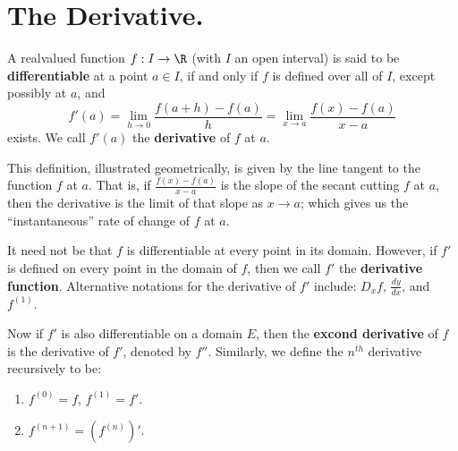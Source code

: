 
\section{The Derivative.}

\begin{definition}
    A realvalued function $f:I \rightarrow \R$ (with $I$ an open interval) is said to be 
    \textbf{differentiable} at a point  $a \in I$, if and only if $f$ is defined 
    over all of  $I$, except possibly at  $a$, and 
        \begin{equation}
            f'(a)=\lim_{h \rightarrow 0}{\frac{f(a+h)-f(a)}{h}}=\lim_{x \rightarrow a}
            {\frac{f(x)-f(a)}{x-a}}		
        \end{equation} 
        exists. We call $f'(a)$ the \textbf{derivative} of $f$ at  $a$.
\end{definition}

This definition, illustrated geometrically, is given by the line tangent to the 
function $f$ at $a$. That is, if  $\frac{f(x)-f(a)}{x-a}$ is the slope of the 
secant cutting $f$ at  $a$, then the derivative is the limit of that slope as  $x \rightarrow a$; 
which gives us the ``instantaneous'' rate of change of $f$ at  $a$.

It need not be that  $f$ is differentiable at every point in its domain. However, 
if  $f'$ is defined on every point in the domain of  $f$, then we call  $f'$ the 
\textbf{derivative function}. Alternative notations for the derivative of $f'$ include: 
$D_x{f}$,  $ \frac{dy}{dx}$, and $f^{(1)}$.

Now if $f'$ is also differentiable on  a domain $E$, then the \textbf{excond derivative} 
of $f$ is the derivative of  $f'$, denoted by  $f''$. Similarly, we define the  $n^{th}$ 
derivative recursively to be:
    \begin{enumerate}[label=(\arabic*)]
         \item $f^{(0)}=f$, $f^{(1)}=f'$.

         \item $f^{(n+1)}=(f^{(n)})'$.
    \end{enumerate}

